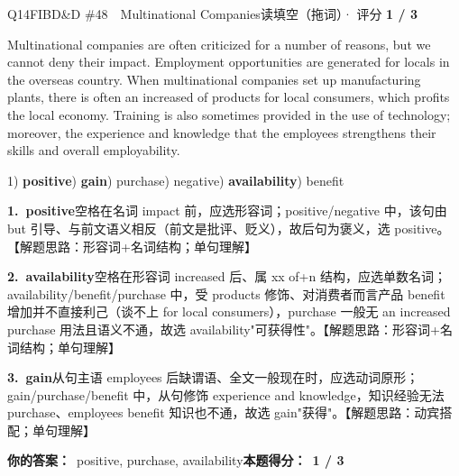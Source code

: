 \begin{qblock}{Q14\quad FIBD\&D \#48\ \ Multinational Companies}{读填空（拖词）· 评分 \textcolor{cAccent}{\bfseries 1 / 3}}
\begin{promptbox}
Multinational companies are often criticized for a number of reasons, but we cannot deny their  impact. Employment opportunities are generated for locals in the overseas country. When multinational companies set up manufacturing plants, there is often an increased  of products for local consumers, which profits the local economy. Training is also sometimes provided in the use of technology; moreover, the experience and knowledge that the employees  strengthens their skills and overall employability.
\end{promptbox}
{\small 1) \textbf{positive}) \textbf{gain}) purchase) negative) \textbf{availability}) benefit}
\begin{notebox}\footnotesize
\textbf{1.\ positive}\quad 空格在名词 impact 前，应选形容词；positive/negative 中，该句由 but 引导、与前文语义相反（前文是批评、贬义），故后句为褒义，选 positive。【解题思路：形容词+名词结构；单句理解】\par\smallskip
\textbf{2.\ availability}\quad 空格在形容词 increased 后、属 xx of+n 结构，应选单数名词；availability/benefit/purchase 中，受 products 修饰、对消费者而言产品 benefit 增加并不直接利己（谈不上 for local consumers），purchase 一般无 an increased purchase 用法且语义不通，故选 availability"可获得性"。【解题思路：形容词+名词结构；单句理解】\par\smallskip
\textbf{3.\ gain}\quad 从句主语 employees 后缺谓语、全文一般现在时，应选动词原形；gain/purchase/benefit 中，从句修饰 experience and knowledge，知识经验无法 purchase、employees benefit 知识也不通，故选 gain"获得"。【解题思路：动宾搭配；单句理解】
\end{notebox}
\smallskip
\textbf{你的答案：}\ positive, {\color{cWrong}purchase, availability}\qquad\textbf{本题得分：}\ {\color{cAccent}\bfseries 1 / 3}
\end{qblock}

